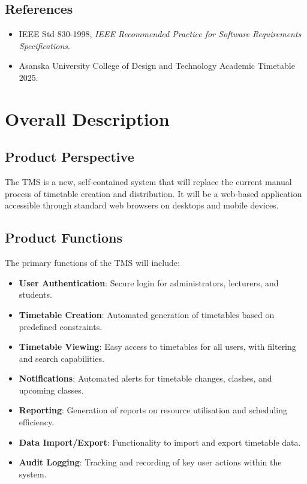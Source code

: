 \documentclass[11pt, a4paper]{article}
\begin{document}
\subsection{References}
\label{sec:references}
\begin{itemize}
    \item IEEE Std 830-1998, \textit{IEEE Recommended Practice for Software Requirements Specifications}.
    \item Asanska University College of Design and Technology Academic Timetable 2025.
\end{itemize}

\section{Overall Description}
\label{sec:overall_description}

\subsection{Product Perspective}
\label{sec:perspective}
The TMS is a new, self-contained system that will replace the current manual process of timetable creation and distribution. It will be a web-based application accessible through standard web browsers on desktops and mobile devices.

\subsection{Product Functions}
\label{sec:functions}
The primary functions of the TMS will include:
\begin{itemize}
    \item \textbf{User Authentication}: Secure login for administrators, lecturers, and students.
    \item \textbf{Timetable Creation}: Automated generation of timetables based on predefined constraints.
    \item \textbf{Timetable Viewing}: Easy access to timetables for all users, with filtering and search capabilities.
    \item \textbf{Notifications}: Automated alerts for timetable changes, clashes, and upcoming classes.
    \item \textbf{Reporting}: Generation of reports on resource utilisation and scheduling efficiency.
    \item \textbf{Data Import/Export}: Functionality to import and export timetable data.
    \item \textbf{Audit Logging}: Tracking and recording of key user actions within the system.
\end{itemize}
\end{document}

